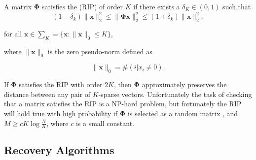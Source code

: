 \begin{mydef}
 A matrix $\boldsymbol{\Phi}$ satisfies the (RIP) of order $K$ if there exists a $\delta_K  \in (0,1)$ such that 
\begin{equation*}
  \label{eq:40}
  (1 - \delta_k)\|\boldsymbol{x}\|^2_2 \leq\|\boldsymbol{\Phi} \boldsymbol{x}\|^2_2 \leq (1 + \delta_k)\|\boldsymbol{x}\|^2_2,
\end{equation*}

for all $\boldsymbol{x} \in \sum_K = \{\boldsymbol{x}:\|\boldsymbol{x}\|_0 \leq K\} $, \newline

where $\|\boldsymbol{x}\|_0$ is the zero pseudo-norm defined as

\begin{equation*}
\|\boldsymbol{x}\|_0 = \#(i|x_i \neq 0). 
\end{equation*}
 
\end{mydef}

%

If $\boldsymbol{\Phi}$ satisfies the RIP with order $2K$, then $\boldsymbol{\Phi}$ approximately preserves the distance between any pair of $K$-sparse vectors. Unfortunately the task of checking that a matrix satisfies the RIP is a NP-hard problem, but fortunately the RIP will hold true with high probability if $\boldsymbol{\Phi}$ is selected as a random matrix \cite{Candes2006a}, and $M \geq cK\log \frac{N}{K}$, where $c$ is a small constant. 



\subsection{Recovery Algorithms}
\label{sec:recovery-algorithms}

